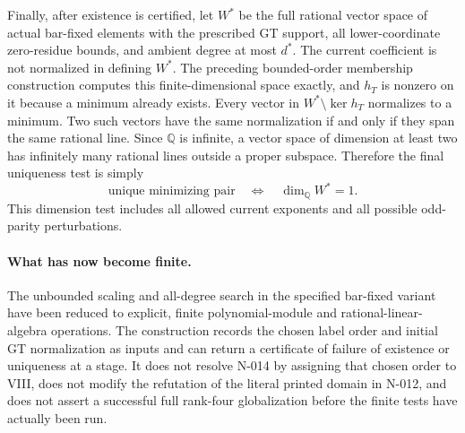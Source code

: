 Finally, after existence is certified, let $W^*$ be the
full rational vector space of actual bar-fixed elements
with the prescribed GT support, all lower-coordinate
zero-residue bounds, and ambient degree at most $d^*$.
The current coefficient is not normalized in defining
$W^*$.  The preceding bounded-order membership construction
computes this finite-dimensional space exactly, and
$h_T$ is nonzero on it because a minimum already exists.
Every vector in $W^*\setminus\ker h_T$ normalizes to a
minimum.  Two such vectors have the same normalization
if and only if they span the same rational line.
Since $\mathbb Q$ is infinite, a vector space of dimension
at least two has infinitely many rational lines outside
a proper subspace.  Therefore the final uniqueness test is
simply
\[
                 \text{unique minimizing pair}
                    \quad\Longleftrightarrow\quad
                 \dim_{\mathbb Q}W^*=1.
 \tag{N-77}
\]
This dimension test includes all allowed current exponents
and all possible odd-parity perturbations.

\paragraph{What has now become finite.}
The unbounded scaling and all-degree search in the specified
bar-fixed variant have been reduced to explicit, finite
polynomial-module and rational-linear-algebra operations.
The construction records the chosen label order and initial
GT normalization as inputs and can return a certificate of
failure of existence or uniqueness at a stage.  It does
not resolve N-014 by assigning that chosen order to VIII,
does not modify the refutation of the literal printed
domain in N-012, and does not assert a successful full
rank-four globalization before the finite tests have
actually been run.
